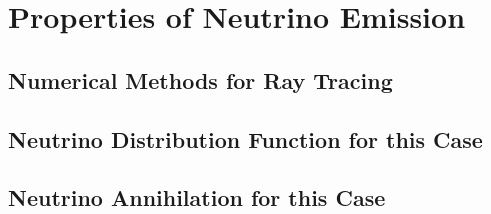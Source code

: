 \chapter{Properties of Neutrino Emission}
\label{chap:rays}

\section{Numerical Methods for Ray Tracing}

\section{Neutrino Distribution Function for this Case}

\section{Neutrino Annihilation for this Case}
